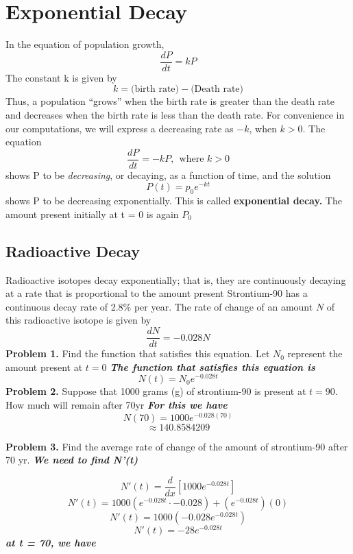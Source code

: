 \documentclass{report}
\begin{document}
\section*{Exponential Decay}
In the equation of population growth,
$$ \dfrac{dP}{dt} = kP$$
The constant k is given by
$$ k = \text{(birth rate)} - \text{(Death rate)}$$
Thus, a population ``grows'' when the birth rate is greater than the death rate and decreases when the birth rate is less than the death rate. For convenience in our computations, we will express a decreasing rate as $-k$, when $k > 0$. The equation
$$ \dfrac{dP}{dt} = -kP, \ \ \text{where } k>0$$
shows P to be \textit{decreasing}, or decaying, as a function of time, and the solution
$$ P(t ) = p_0e^{-kt}$$
shows P to be decreasing exponentially. This is called \textbf{exponential decay.} The amount present initially at t = 0 is again $P_0$
\bigbreak \noindent
\begin{minipage}{0.5\textwidth}
\end{minipage}
\begin{minipage}{0.5\textwidth}
\end{minipage}
\bigbreak \noindent
\subsection*{Radioactive Decay}
Radioactive isotopes decay exponentially; that is, they are continuously decaying at a rate that is proportional to the amount present
\q
Strontium-90 has a continuous decay rate of 2.8\% per year. The rate of change of an amount $N$ of this radioactive isotope is given by
$$ \dfrac{dN}{dt} = -0.028N$$
\bigbreak \noindent
\textbf{Problem 1.} Find the function that satisfies this equation. Let $N_0$ represent the amount present at $ t=0$
\bigbreak \noindent
\textit{\textbf{The function that satisfies this equation is}}
$$ N(t) = N_0e^{-0.028t}$$
\bigbreak \noindent
\textbf{Problem 2.} Suppose that 1000 grams (g) of strontium-90 is present at $ t=90$. How much will remain after 70yr
\bigbreak \noindent
\textit{\textbf{For this we have}}
$$ N(70) = 1000e^{-0.028(70)}$$ 
$$ \approx 140.8584209$$

\pagebreak \noindent
\textbf{Problem 3.} Find the average rate of change of the amount of strontium-90 after 70 yr.
\bigbreak \noindent
\textit{\textbf{We need to find N'(t)}}

$$ N'(t) = \frac{d}{dx}\left[1000e^{-0.028t}\right]$$
$$ N'(t) = 1000(e^{-0.028t} \cdot -0.028) + (e^{-0.028t})(0)$$
$$ N'(t) = 1000(-0.028e^{-0.028t})$$
$$ N'(t) = -28e^{-0.028t}$$
\textit{\textbf{at t = 70, we have}}
\end{document}
